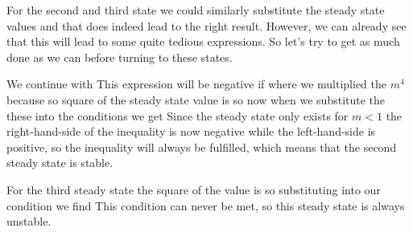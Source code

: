 For the second and third state we could similarly substitute the steady state values and that does indeed lead to the right result. However, we can already see that this will lead to some quite tedious expressions. 
So let's try to get as much done as we can before turning to these states. 

We continue with 
This expression will be negative if 
where we multiplied the $m^4$ because
so square of the steady state value is 
so now when we substitute the these into the conditions we get 
Since the steady state only exists for $m<1$ the right-hand-side of the inequality is now negative while the left-hand-side is positive, so the inequality will always be fulfilled, which means that the second steady state is stable.

For the third steady state 
the square of the value is 
so substituting into our condition we find 
This condition can never be met, so this steady state is always unstable. 

